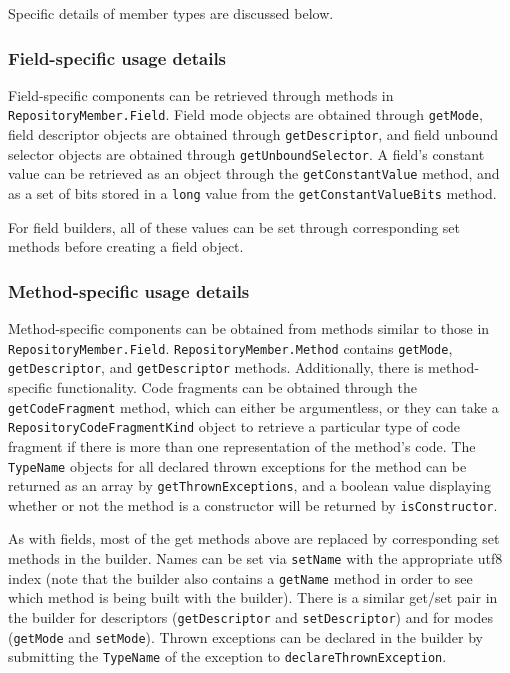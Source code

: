 \documentclass{report}
\begin{document}
Specific details of member types are discussed below.

\subsubsection{Field-specific usage details}

Field-specific components can be retrieved through methods in 
\texttt{Re\-pos\-i\-tory\-Mem\-ber.Field}. Field mode objects are obtained 
through \texttt{getMode}, field descriptor objects are obtained through
\texttt{getDescriptor}, and field unbound selector objects are obtained
through \texttt{getUnboundSelector}. A field's constant value can be
retrieved as an object through the \texttt{getConstantValue} method,
and as a set of bits stored in a \texttt{long} value from the
\texttt{getConstantValueBits} method.

For field builders, all of these values can be set through corresponding
set methods before creating a field object.

\subsubsection{Method-specific usage details}

Method-specific components can be obtained from methods similar to
those in \texttt{Re\-pos\-i\-tory\-Mem\-ber.Field}. 
\texttt{Re\-pos\-i\-tory\-Mem\-ber.Meth\-od} contains \texttt{getMode}, 
\texttt{getDescriptor}, and \texttt{getDescriptor} methods. Additionally, 
there is method-specific functionality. Code fragments can be obtained through 
the \texttt{get\-Code\-Fragment} method, which can either be argumentless, or 
they can take a \texttt{Re\-pos\-i\-tory\-Code\-Frag\-ment\-Kind} object to 
retrieve a particular type of code fragment if there is more than one 
representation of the method's code. The \texttt{TypeName} objects for all 
declared thrown exceptions for the method can be returned as an array by 
\texttt{getThrownExceptions}, and a boolean value displaying whether or not 
the method is a constructor will be returned by \texttt{isConstructor}.

As with fields, most of the get methods above are replaced by corresponding
set methods in the builder. Names can be set via \texttt{setName} with
the appropriate utf8 index (note that the builder also contains a
\texttt{getName} method in order to see which method is being built
with the builder). There is a similar get/set pair in the builder for
descriptors (\texttt{getDescriptor} and \texttt{setDescriptor}) and
for modes (\texttt{getMode} and \texttt{setMode}). Thrown exceptions
can be declared in the builder by submitting the \texttt{TypeName} of the 
exception to \texttt{declareThrownException}.
\end{document}
